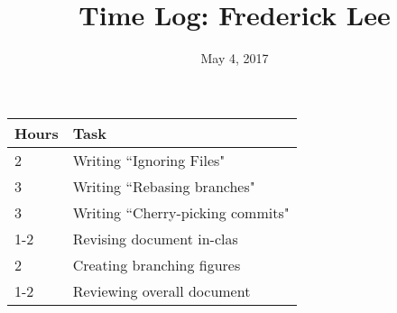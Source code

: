 \documentclass{article}
\title{Time Log: Frederick Lee}
\date{May 4, 2017}
\begin{document}
\maketitle

\begin{table}[h]
\centering
\label{my-label}
\begin{tabular}{ll}
\textbf{Hours} & \textbf{Task}            \\ \hline
2     & Writing ``Ignoring Files"         \\
3     & Writing ``Rebasing branches"      \\
3     & Writing ``Cherry-picking commits" \\
1-2   & Revising document in-clas         \\
2     & Creating branching figures        \\
1-2   & Reviewing overall document
\end{tabular}
\end{table}
\end{document}
